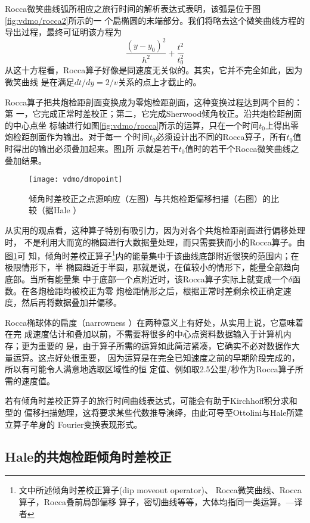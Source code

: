 Rocca微笑曲线弧所相应之旅行时间的解析表达式表明，该弧是位于图\ref{fig:vdmo/rocca2}所示的一
个扃椭圆的末端部分。我们将略去这个微笑曲线方程的导出过程，最终可证明该方程为
\begin{equation}
\frac{(y-y_0)^2}{h^2}+\frac{t^2}{t_0^2} 
\label{eq:ex3.6.2}
\end{equation}
从这十方程看，Rocca算子好像是同速度无关似的。其实，它并不完全如此，因为微笑曲线
是在满足$dt/dy=2/v$关系的点上才截止的。

Rocca算子把共炮检距剖面变换成为零炮检距剖面，这种变换过程达到两个目的：第
一，它完成正常时差校正；第二，它完成Sherwood倾角校正。沿共炮检距剖面的中心点坐
标轴进行如图\ref{fig:vdmo/rocca}所示的运算，只在一个时间$t_0$上得出零炮检距剖面作为输出。对于每一
个时间$t_0$必须设计出不同的Rocca算子，所有$t_0$值时得出的输出必须叠加起来。图\ref{fig:vdmo/dmopoint}所
示就是若干$t_0$值时的若干个Rocca微笑曲线之叠加结果。

\begin{figure}[H]
\centering
\texttt{[image: vdmo/dmopoint]}
\caption[dmopoint]{倾角时差校正之点源响应（左图）与共炮检距偏移扫描（右图）的比较（据Hale
）}
\label{fig:vdmo/dmopoint}
\end{figure}

从实用的观点看，这种算子特别有吸引力，因为对各个共炮检距剖面进行偏移处理时，
不是利用大而宽的椭圆进行大数据量处理，而只需要狭而小的Rocca算子。由图\ref{fig:vdmo/dmopoint}可
知，倾角时差校正算子\footnote{
文中所述倾角时差校正算子(dip moveout operator)、
Rocca微笑曲线、Rocca算子，Rocca叠前局部偏移
算子，密切曲线等等，大体均指同一类运算。---译者
}内的能量集中于该曲线底部附近很狭的范围内；在极限情形下，半
椭圆趋近于半圆，那就是说，在值较小的情形下，能量全部趋向底部。当所有能量集
中于底部一个点附近时，该Rocca算子实际上就变成一个$\delta$函数。在各炮检距均被校正为零
炮检距情形之后，根据正常时差剩余校正确定速度，然后再将数据叠加并偏移。

Rocca椭球体的扁度（narrowness
）在两种意义上有好处，从实用上说，它意味着在完
成速度估计和叠加以前，不需要将很多的中心点资料数据输入于计算机内存；更为重要的
是，由于算子所需的运算如此简洁紧凑，它确实不必对数据作大量运算。这点好处很重要，
因为运算是在完全已知速度之前的早期阶段完成的，所以有可能令人满意地选取区域性的恒
定值、例如取2.5公里/秒作为Rocca算子所需的速度值。

若有倾角时差校正算子的旅行时间曲线表达式，可能会有助于Kirchhoff积分求和型的
偏移扫描勉理，这将要求某些代数推导演绎，由此可导至Ottolini与Hale所建立算子牟身的
Fourier变换表现形式。

\subsection{Hale的共炮检距倾角时差校正}
\label{sec:3.6.3}

